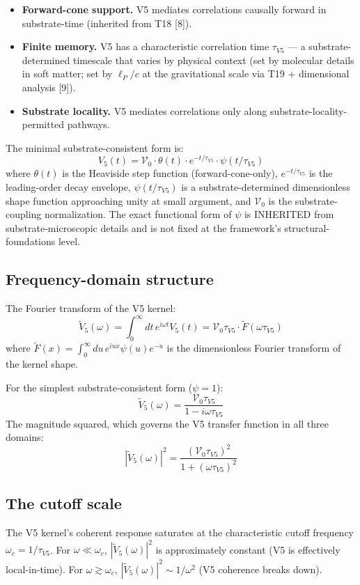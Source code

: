 \documentclass[11pt,a4paper]{article}
\begin{document}
\begin{itemize}[noitemsep]
\item \textbf{Forward-cone support.} V5 mediates correlations causally forward in substrate-time (inherited from T18 [8]).
\item \textbf{Finite memory.} V5 has a characteristic correlation time $\tau_{V5}$ --- a substrate-determined timescale that varies by physical context (set by molecular details in soft matter; set by $\ell_P/c$ at the gravitational scale via T19 + dimensional analysis [9]).
\item \textbf{Substrate locality.} V5 mediates correlations only along substrate-locality-permitted pathways.
\end{itemize}

The minimal substrate-consistent form is:
\[
V_5(t) = \mathcal{V}_0 \cdot \theta(t) \cdot e^{-t/\tau_{V5}} \cdot \psi(t/\tau_{V5})
\]
where $\theta(t)$ is the Heaviside step function (forward-cone-only), $e^{-t/\tau_{V5}}$ is the leading-order decay envelope, $\psi(t/\tau_{V5})$ is a substrate-determined dimensionless shape function approaching unity at small argument, and $\mathcal{V}_0$ is the substrate-coupling normalization. The exact functional form of $\psi$ is INHERITED from substrate-microscopic details and is not fixed at the framework's structural-foundations level.

\subsection{Frequency-domain structure}

The Fourier transform of the V5 kernel:
\[
\tilde V_5(\omega) = \int_0^\infty dt \, e^{i\omega t} V_5(t) = \mathcal{V}_0 \tau_{V5} \cdot \tilde F(\omega \tau_{V5})
\]
where $\tilde F(x) = \int_0^\infty du \, e^{iux} \psi(u) e^{-u}$ is the dimensionless Fourier transform of the kernel shape.

For the simplest substrate-consistent form ($\psi = 1$):
\[
\tilde V_5(\omega) = \frac{\mathcal{V}_0 \tau_{V5}}{1 - i\omega\tau_{V5}}
\]
The magnitude squared, which governs the V5 transfer function in all three domains:
\[
|\tilde V_5(\omega)|^{2} = \frac{(\mathcal{V}_0 \tau_{V5})^{2}}{1 + (\omega\tau_{V5})^{2}}
\]

\subsection{The cutoff scale}

The V5 kernel's coherent response saturates at the characteristic cutoff frequency $\omega_c = 1/\tau_{V5}$. For $\omega \ll \omega_c$, $|\tilde V_5(\omega)|^{2}$ is approximately constant (V5 is effectively local-in-time). For $\omega \gtrsim \omega_c$, $|\tilde V_5(\omega)|^{2} \sim 1/\omega^{2}$ (V5 coherence breaks down).
\end{document}
